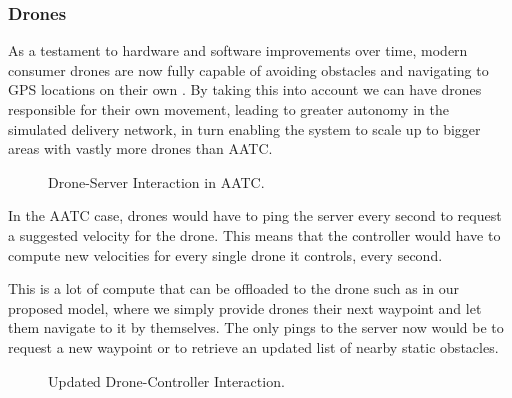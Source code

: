 \documentclass[a4paper,12pt,titlepage]{article}
\begin{document}
\subsubsection{Drones}
As a testament to hardware and software improvements over time, modern consumer drones are now fully capable of avoiding obstacles \cite{DJI} and navigating to GPS locations on their own \cite{DJIb}. By taking this into account we can have drones responsible for their own movement, leading to greater autonomy in the simulated delivery network, in turn enabling the system to scale up to bigger areas with vastly more drones than AATC.\\

\begin{figure}[!hbpt]
 \centering
 \caption{Drone-Server Interaction in AATC.}
 \end{figure}

In the AATC case, drones would have to ping the server every second to request a suggested velocity for the drone. This means that the controller would have to compute new velocities for every single drone it controls, every second.

This is a lot of compute that can be offloaded to the drone such as in our proposed model, where we simply provide drones their next waypoint and let them navigate to it by themselves. The only pings to the server now would be to request a new waypoint or to retrieve an updated list of nearby static obstacles.

 \begin{figure}[!hbpt]
  \centering
  \caption{Updated Drone-Controller Interaction.}
  \end{figure}
\end{document}
